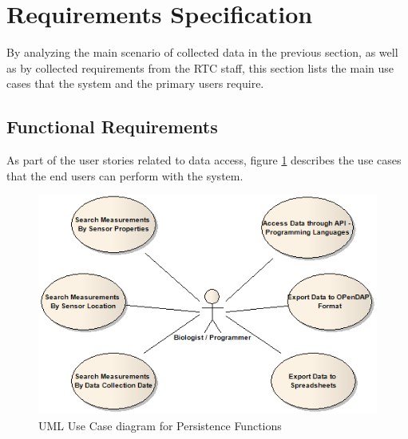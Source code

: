 \section{Requirements Specification}

By analyzing the main scenario of collected data in the previous section, as
well as by collected requirements from the RTC staff, this section lists the
main use cases that the system and the primary users require.

\subsection{Functional Requirements}
\label{sec:use-cases}

As part of the user stories related to data access, figure
\ref{fig:DSP-Data-Persistence-UseCases-Diagram-Users} describes the use cases
that the end users can perform with the system.

\begin{figure}[!b]
  \centering
  \includegraphics[scale=0.5]{../diagrams/DSP-Data-Persistence-UseCases-Diagram-Users}
  \caption{UML Use Case diagram for Persistence Functions}
  \label{fig:DSP-Data-Persistence-UseCases-Diagram-Users}
\end{figure}

